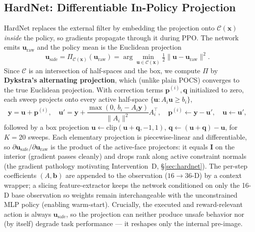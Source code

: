 \documentclass[11pt]{article}
\begin{document}
\subsection{HardNet: Differentiable In-Policy Projection}
\label{sec:hardnetmath}
HardNet replaces the external filter by embedding the projection onto
$\mathcal C(\mathbf x)$ \emph{inside} the policy, so gradients propagate
through it during PPO. The network emits $\mathbf u_\text{raw}$ and the policy
mean is the Euclidean projection
\begin{equation}
\mathbf u_\text{safe}=\Pi_{\mathcal C(\mathbf x)}(\mathbf u_\text{raw})
=\arg\min_{\mathbf u\in\mathcal C(\mathbf x)}\tfrac12\lVert\mathbf u-\mathbf u_\text{raw}\rVert^2 .
\end{equation}
Since $\mathcal C$ is an intersection of half-spaces and the box, we compute
$\Pi$ by \textbf{Dykstra's alternating projection}, which (unlike plain POCS)
converges to the true Euclidean projection. With correction terms
$\mathbf p^{(i)},\mathbf q$ initialized to zero, each sweep projects onto every
active half-space $\{\mathbf u:A_i\mathbf u\ge b_i\}$,
\begin{equation}
\mathbf y=\mathbf u+\mathbf p^{(i)},\quad
\mathbf u'=\mathbf y+\frac{\max(0,\,b_i-A_i\mathbf y)}{\lVert A_i\rVert^2}A_i^\top,\quad
\mathbf p^{(i)}\leftarrow\mathbf y-\mathbf u',\quad\mathbf u\leftarrow\mathbf u',
\end{equation}
followed by a box projection $\mathbf u\leftarrow\mathrm{clip}(\mathbf u+\mathbf q,-1,1)$,
$\mathbf q\leftarrow(\mathbf u+\mathbf q)-\mathbf u$, for $K{=}20$ sweeps. Each
elementary projection is piecewise-linear and differentiable, so
$\partial\mathbf u_\text{safe}/\partial\mathbf u_\text{raw}$ is the product of
the active-face projectors: it equals $\mathbf I$ on the interior (gradient
passes cleanly) and drops rank along active constraint normals (the gradient
pathology motivating Intervention~D, \S\ref{sec:hardnet}). The per-step
coefficients $(A,\mathbf b)$ are appended to the observation
($16\!\rightarrow\!36$-D) by a context wrapper; a slicing feature-extractor
keeps the network conditioned on only the 16-D base observation so weights
remain interchangeable with the unconstrained MLP policy (enabling warm-start).
Crucially, the executed and reward-relevant action is always
$\mathbf u_\text{safe}$, so the projection can neither produce unsafe behavior
nor (by itself) degrade task performance --- it reshapes only the internal
pre-image.
\end{document}
